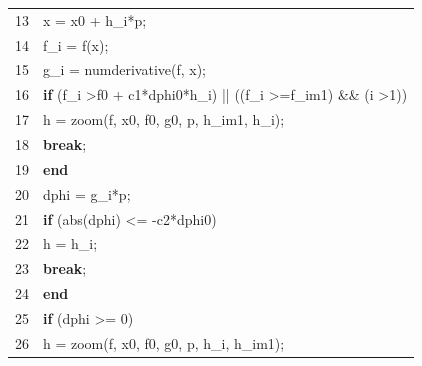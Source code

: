 \documentclass[bosnian,12pt,a4paper]{report}
\begin{document}
\begin{tabular}{ll}
13 & \hspace*{2cm}x = x0 + h\_i*p;                                                                                    \\
14 & \hspace*{2cm}f\_i = f(x);                                                                                        \\
15 & \hspace*{2cm}g\_i = numderivative(f, x);                                                                         \\
16 & \hspace*{2cm}\textbf{if} (f\_i \textgreater f0 + c1*dphi0*h\_i) || ((f\_i \textgreater{}=f\_im1) \&\& (i \textgreater 1)) \\
17 & \hspace*{3cm}h = zoom(f, x0, f0, g0, p, h\_im1, h\_i);                                                           \\
18 & \hspace*{3cm}\textbf{break};                                                                                              \\
19 & \hspace*{2cm}\textbf{end                                                                                                } \\
20 & \hspace*{2cm}dphi = g\_i*p;                                                                                      \\
21 & \hspace*{2cm}\textbf{if} (abs(dphi) \textless{}= -c2*dphi0)                                                               \\
22 & \hspace*{3cm}h = h\_i;                                                                                           \\
23 & \hspace*{3cm}\textbf{break};                                                                                              \\
24 & \hspace*{2cm}\textbf{end} 
\\
25 & \hspace*{2cm}\textbf{if} (dphi \textgreater{}= 0)                                                                         \\
26 & \hspace*{3cm}h = zoom(f, x0, f0, g0, p, h\_i, h\_im1);                                                           \\

\end{tabular}
\end{document}
